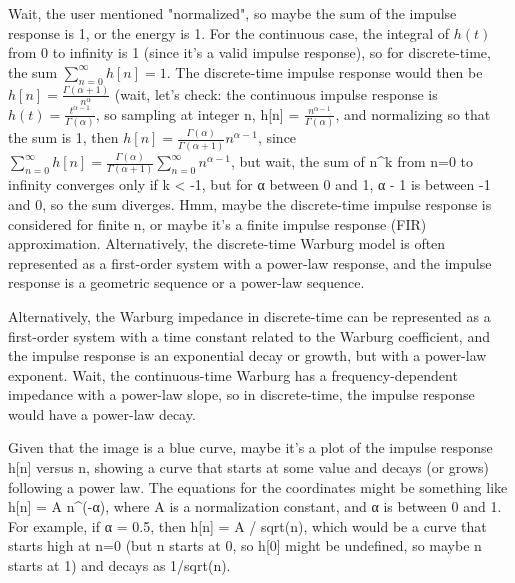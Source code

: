 Wait, the user mentioned "normalized", so maybe the sum of the impulse response is 1, or the energy is 1. For the continuous case, the integral of \( h(t) \) from 0 to infinity is 1 (since it's a valid impulse response), so for discrete-time, the sum \( \sum_{n=0}^\infty h[n] = 1 \). The discrete-time impulse response would then be \( h[n] = \frac{\Gamma(\alpha + 1)}{n^{\alpha}} \) (wait, let's check: the continuous impulse response is \( h(t) = \frac{t^{\alpha - 1}}{\Gamma(\alpha)} \), so sampling at integer n, h[n] = \( \frac{n^{\alpha - 1}}{\Gamma(\alpha)} \), and normalizing so that the sum is 1, then \( h[n] = \frac{\Gamma(\alpha)}{\Gamma(\alpha + 1)} n^{\alpha - 1} \), since \( \sum_{n=0}^\infty h[n] = \frac{\Gamma(\alpha)}{\Gamma(\alpha + 1)} \sum_{n=0}^\infty n^{\alpha - 1} \), but wait, the sum of n^k from n=0 to infinity converges only if k < -1, but for α between 0 and 1, α - 1 is between -1 and 0, so the sum diverges. Hmm, maybe the discrete-time impulse response is considered for finite n, or maybe it's a finite impulse response (FIR) approximation. Alternatively, the discrete-time Warburg model is often represented as a first-order system with a power-law response, and the impulse response is a geometric sequence or a power-law sequence. 

Alternatively, the Warburg impedance in discrete-time can be represented as a first-order system with a time constant related to the Warburg coefficient, and the impulse response is an exponential decay or growth, but with a power-law exponent. Wait, the continuous-time Warburg has a frequency-dependent impedance with a power-law slope, so in discrete-time, the impulse response would have a power-law decay. 

Given that the image is a blue curve, maybe it's a plot of the impulse response h[n] versus n, showing a curve that starts at some value and decays (or grows) following a power law. The equations for the coordinates might be something like h[n] = A n^(-α), where A is a normalization constant, and α is between 0 and 1. For example, if α = 0.5, then h[n] = A / sqrt(n), which would be a curve that starts high at n=0 (but n starts at 0, so h[0] might be undefined, so maybe n starts at 1) and decays as 1/sqrt(n). 

